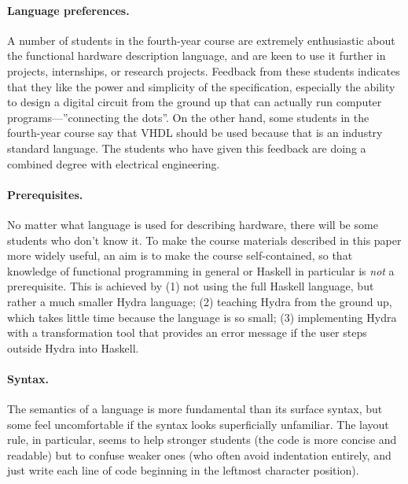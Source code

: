 \documentclass[submission,copyright,creativecommons]{eptcs}
\begin{document}
\paragraph{Language preferences.}
A number of students in the fourth-year course are extremely
enthusiastic about the functional hardware description language,
and are keen to use it further in projects, internships, or
research projects.  Feedback from these students indicates that
they like the power and simplicity of the specification, especially
the ability to design a digital circuit from the ground up that can
actually run computer programs---''connecting the dots''.  On the
other hand, some students in the fourth-year course say that VHDL
should be used because that is an industry standard language.  The
students who have given this feedback are doing a combined degree
with electrical engineering.

\paragraph{Prerequisites.}
No matter what language is used for describing hardware, there will
be some students who don't know it. To make the course materials
described in this paper more widely useful, an aim is to make the
course self-contained, so that knowledge of functional programming
in general or Haskell in particular is \emph{not} a prerequisite.
This is achieved by (1) not using the full Haskell language, but
rather a much smaller Hydra language; (2) teaching Hydra from the
ground up, which takes little time because the language is so
small; (3) implementing Hydra with a transformation tool that
provides an error message if the user steps outside Hydra into
Haskell.

\paragraph{Syntax.}
The semantics of a language is more fundamental than its surface
syntax, but some feel uncomfortable if the syntax looks
superficially unfamiliar.  The layout rule, in particular, seems to
help stronger students (the code is more concise and readable) but
to confuse weaker ones (who often avoid indentation entirely, and
just write each line of code beginning in the leftmost character
position).
\end{document}
